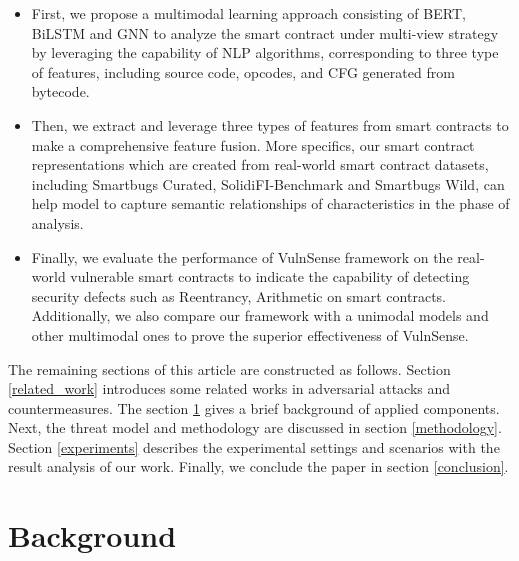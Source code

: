 \begin{itemize}
    \item First, we propose a multimodal learning approach consisting of BERT, BiLSTM and GNN to analyze the smart contract under multi-view strategy by leveraging the capability of NLP algorithms, corresponding to three type of features, including source code, opcodes, and CFG generated from bytecode. 

    \item Then, we extract and leverage three types of features from smart contracts to make a comprehensive feature fusion. More specifics, our smart contract representations which are created from real-world smart contract datasets, including Smartbugs Curated, SolidiFI-Benchmark and Smartbugs Wild, can help model to capture semantic relationships of characteristics in the phase of analysis.
    
    \item Finally, we evaluate the performance of VulnSense framework on the real-world vulnerable smart contracts to indicate the capability of detecting security defects such as Reentrancy, Arithmetic on smart contracts. Additionally, we also compare our framework with a unimodal models and other multimodal ones to prove the superior effectiveness of VulnSense.
\end{itemize}
The remaining sections of this article are constructed as follows. Section \ref{related_work} introduces some related works in adversarial attacks and countermeasures. The section \ref{Background} gives a brief background of applied components. Next, the threat model and methodology are discussed in section \ref{methodology}. Section \ref{experiments} describes the experimental settings and scenarios with the result analysis of our work. Finally, we conclude the paper in section \ref{conclusion}.

\section{Background} \label{Background}
